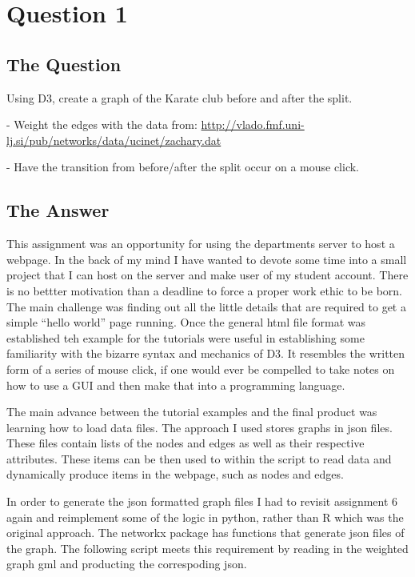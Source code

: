 \section{Question 1}

\subsection{The Question}

\begin{flushleft}

Using D3, create a graph of the Karate club before and after
the split.

- Weight the edges with the data from: 
\url{http://vlado.fmf.uni-lj.si/pub/networks/data/ucinet/zachary.dat}

- Have the transition from before/after the split occur on a mouse
click.

\end{flushleft}
\subsection{The Answer}

This assignment was an opportunity for using the departments server to host a webpage. In the back of my mind I have wanted to devote some time into a small project that I can host on the server and make user of my student account. There is no bettter motivation than a deadline to force a proper work ethic to be born. The main challenge was finding out all the little details that are required to get a simple ``hello world'' page running. Once the general html file format was established teh example for the tutorials were useful in establishing some familiarity with the bizarre syntax and mechanics of D3. It resembles the written form of a series of mouse click, if one would ever be compelled to take notes on how to use a GUI and then make that into a programming language. 

The main advance between the tutorial examples and the final product was learning how to load data files. The approach I used stores graphs in json files. These files contain lists of the nodes and edges as well as their respective attributes. These items can be then used to within the script to read data and dynamically produce items in the webpage, such as nodes and edges. 

In order to generate the json formatted graph files I had to revisit assignment 6 again and reimplement some of the logic in python, rather than R which was the original approach. The networkx package has functions that generate json files of the graph. The following script meets this requirement by reading in the weighted graph gml and producting the correspoding json. 


